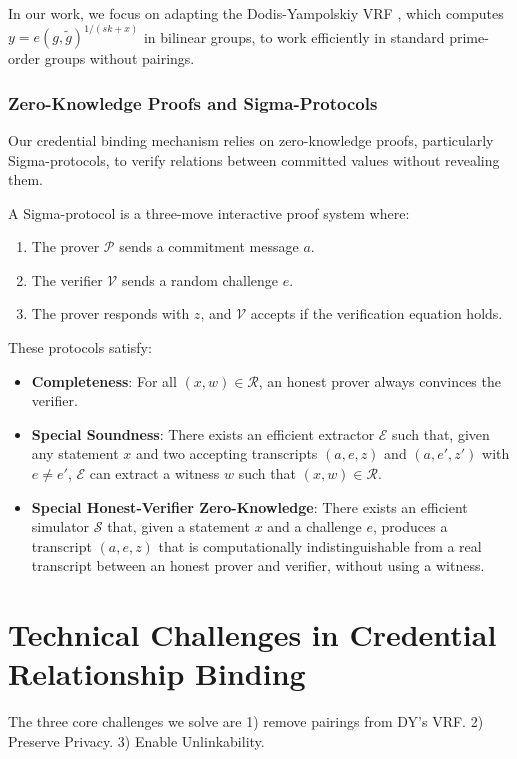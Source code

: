     
In our work, we focus on adapting the Dodis-Yampolskiy VRF \cite{hutchison_verifiable_2005}, which computes $y = e(g, \tilde{g})^{1/(sk+x)}$ in bilinear groups, to work efficiently in standard prime-order groups without pairings.

\subsubsection{Zero-Knowledge Proofs and Sigma-Protocols}
Our credential binding mechanism relies on zero-knowledge proofs, particularly Sigma-protocols, to verify relations between committed values without revealing them.

A Sigma-protocol is a three-move interactive proof system where:
\begin{enumerate}
    \item The prover $\mathcal{P}$ sends a commitment message $a$.
    \item The verifier $\mathcal{V}$ sends a random challenge $e$.
    \item The prover responds with $z$, and $\mathcal{V}$ accepts if the verification equation holds.
\end{enumerate}
These protocols satisfy:
\begin{itemize}
    \item \textbf{Completeness}: For all $(x,w) \in \mathcal{R}$, an honest prover always convinces the verifier.
    \item \textbf{Special Soundness}: There exists an efficient extractor $\mathcal{E}$ such that, given any statement $x$ and two accepting transcripts $(a,e,z)$ and $(a,e',z')$ with $e \neq e'$, $\mathcal{E}$ can extract a witness $w$ such that $(x,w) \in \mathcal{R}$.
    \item \textbf{Special Honest-Verifier Zero-Knowledge}: There exists an efficient simulator $\mathcal{S}$ that, given a statement $x$ and a challenge $e$, produces a transcript $(a,e,z)$ that is computationally indistinguishable from a real transcript between an honest prover and verifier, without using a witness.
\end{itemize}





\section{Technical Challenges in Credential Relationship Binding}

The three core challenges we solve are 1) remove pairings from DY's VRF. 2) Preserve Privacy. 3) Enable Unlinkability.


